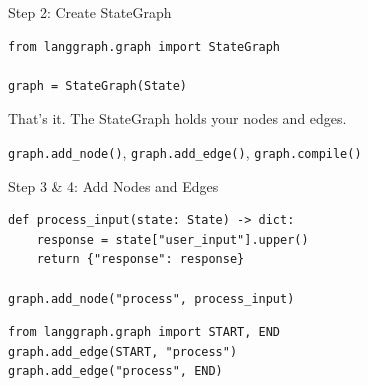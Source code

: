 \documentclass[aspectratio=169,11pt]{beamer}
\begin{document}
\begin{frame}[fragile,t]{Step 2: Create StateGraph}
\vspace{0.1cm}

\begin{codebox}[Initialize]
\begin{lstlisting}
from langgraph.graph import StateGraph

graph = StateGraph(State)
\end{lstlisting}
\end{codebox}

\vspace{0.15cm}

That's it. The StateGraph holds your nodes and edges.

\vspace{0.15cm}

\begin{tipbox}[Methods]
\texttt{graph.add\_node()}, \texttt{graph.add\_edge()}, \texttt{graph.compile()}
\end{tipbox}
\end{frame}

\begin{frame}[fragile,t]{Step 3 \& 4: Add Nodes and Edges}
\vspace{0.05cm}

\begin{codebox}
\begin{lstlisting}
def process_input(state: State) -> dict:
    response = state["user_input"].upper()
    return {"response": response}

graph.add_node("process", process_input)
\end{lstlisting}
\end{codebox}

\vspace{0.1cm}

\begin{codebox}
\begin{lstlisting}
from langgraph.graph import START, END
graph.add_edge(START, "process")
graph.add_edge("process", END)
\end{lstlisting}
\end{codebox}
\end{frame}
\end{document}
